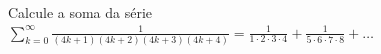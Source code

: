 Calcule a soma da série
\(\sum_{k=0}^{\infty} \frac{1}{(4k+1)(4k+2)(4k+3)(4k+4)} = \frac{1}{1\cdot2\cdot3\cdot4} + \frac{1}{5\cdot6\cdot7\cdot8} + \dots\)

